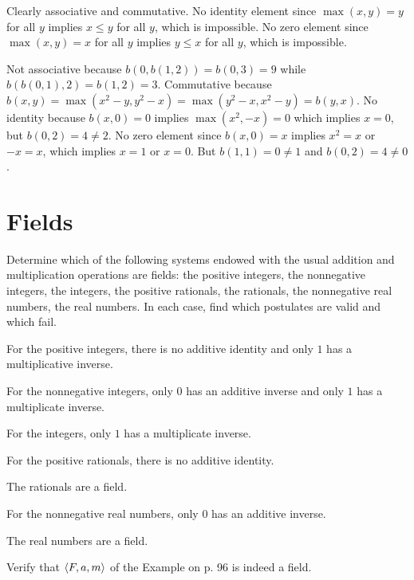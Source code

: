 \begin{solution}
\begin{enumalpha}
    \item Clearly associative and commutative. No identity element since $\max(x,y)=y$ for all $y$
    implies $x\leq y$ for all $y$, which is impossible.
    No zero element since $\max(x,y)=x$ for all $y$ implies $y\leq x$ for all $y$, which is impossible. 

    \item Not associative because $b(0,b(1,2))=b(0,3)=9$ while $b(b(0,1),2)=b(1,2)=3$.
    Commutative because $b(x,y)=\max(x^2-y,y^2-x)=\max(y^2-x,x^2-y)=b(y,x)$.
    No identity because $b(x,0)=0$ implies $\max(x^2,-x)=0$ which implies $x=0$, but $b(0,2)=4\neq 2$.
    No zero element since $b(x,0)=x$ implies $x^2=x$ or $-x=x$, which implies $x=1$ or $x=0$.
    But $b(1,1)=0\neq 1$ and $b(0,2)=4\neq 0$.
\end{enumalpha}
\end{solution}

\section{Fields}
\begin{exercise}
Determine which of the following systems endowed with the usual addition and
multiplication operations are fields: the positive integers, the nonnegative integers, the
integers, the positive rationals, the rationals, the nonnegative real numbers, the real
numbers. In each case, find which postulates are valid and which fail.
\end{exercise}

\begin{solution}
For the positive integers, there is no additive identity and only $1$ has a multiplicative
inverse.

For the nonnegative integers, only $0$ has an additive inverse and only $1$ has a multiplicate inverse.

For the integers, only $1$ has a multiplicate inverse.

For the positive rationals, there is no additive identity.

The rationals are a field.

For the nonnegative real numbers, only $0$ has an additive inverse.

The real numbers are a field.
\end{solution}

\begin{exercise}
Verify that $\left\langle F, a, m\right\rangle$ of the Example on p. 96 is indeed a field.
\end{exercise}

